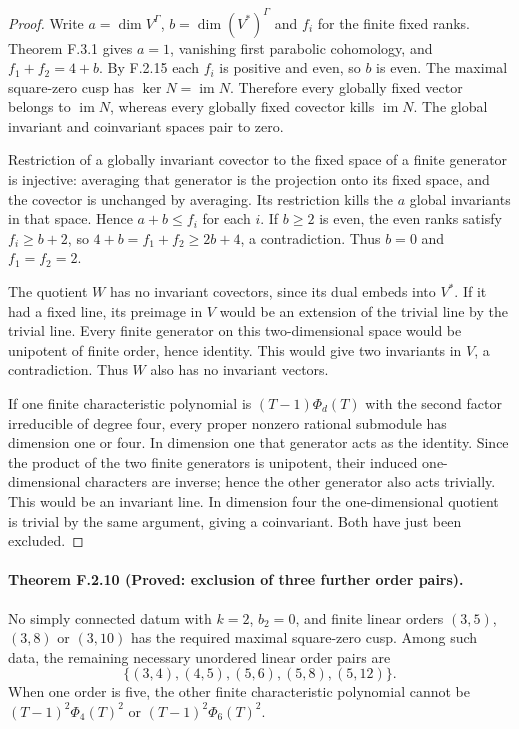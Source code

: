 \begin{proof}
Write $a=\dim V^\Gamma$, $b=\dim(V^*)^\Gamma$ and $f_i$
for the finite fixed ranks.  Theorem F.3.1 gives $a=1$,
vanishing first parabolic cohomology, and
$f_1+f_2=4+b$.  By F.2.15 each $f_i$ is positive and even, so $b$ is
even.  The maximal square-zero cusp has
$\ker N=\operatorname{im}N$.  Therefore every globally
fixed vector belongs to $\operatorname{im}N$, whereas every
globally fixed covector kills $\operatorname{im}N$.
The global invariant and coinvariant spaces pair to zero.

Restriction of a globally invariant covector to the fixed
space of a finite generator is injective: averaging that
generator is the projection onto its fixed space, and the
covector is unchanged by averaging.  Its restriction kills
the $a$ global invariants in that space.  Hence
$a+b\leq f_i$ for each $i$.
If $b\geq2$ is even, the even ranks satisfy
$f_i\geq b+2$, so $4+b=f_1+f_2\geq2b+4$, a contradiction.
Thus $b=0$ and $f_1=f_2=2$.

The quotient $W$ has no invariant covectors, since its dual
embeds into $V^*$.  If it had a fixed line, its preimage in
$V$ would be an extension of the trivial line by the trivial
line.  Every finite generator on this two-dimensional
space would be unipotent of finite order, hence identity.
This would give two invariants in $V$, a contradiction.
Thus $W$ also has no invariant vectors.

If one finite characteristic polynomial is
$(T-1)\Phi_d(T)$ with the second factor irreducible of degree
four, every proper nonzero rational submodule has dimension
one or four.  In dimension one that generator acts as the
identity.  Since the product of the two finite generators
is unipotent, their induced one-dimensional characters are
inverse; hence the other generator also acts trivially.
This would be an invariant line.  In dimension four the
one-dimensional quotient is trivial by the same argument,
giving a coinvariant.  Both have just been excluded.
\end{proof}

\paragraph{Theorem F.2.10 (Proved: exclusion of three further order pairs).}
No simply connected datum with $k=2$, $b_2=0$, and finite linear orders
$(3,5)$, $(3,8)$ or $(3,10)$ has the required maximal
square-zero cusp.  Among such data, the
remaining necessary unordered linear order pairs are
\[
 \{(3,4),(4,5),(5,6),(5,8),(5,12)\}.
 \tag{F.30}
\]
When one order is five, the other finite characteristic
polynomial cannot be $(T-1)^2\Phi_4(T)^2$ or
$(T-1)^2\Phi_6(T)^2$.

